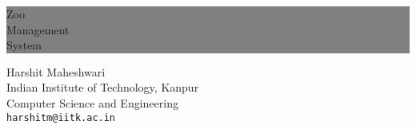\thispagestyle{empty} %


\colorbox{grey}{
	\parbox[t]{1.0\linewidth}{
		\centering \fontsize{50pt}{80pt}\selectfont %
		\vspace*{0.7cm} %
		
		\hfill Zoo\\
		\hfill Management  \\
		\hfill System\\
		
		\vspace*{0.7cm} %
	}
}


\vfill %


{\centering \large 
\hfill Harshit Maheshwari\\
\hfill Indian Institute of Technology, Kanpur \\
\hfill Computer Science and Engineering\\
\hfill \texttt{harshitm@iitk.ac.in} \\

\HRule{1pt}} %


\clearpage %
